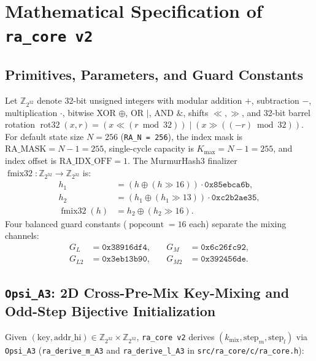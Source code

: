 \documentclass[conference]{IEEEtran}
\DeclareMathOperator{\rot}{rot32}
\DeclareMathOperator{\fmix}{fmix32}
\DeclareMathOperator{\popcount}{popcount}
\begin{document}
\section{Mathematical Specification of \texttt{ra\_core v2}}\label{sec:arch}

\subsection{Primitives, Parameters, and Guard Constants}

Let $\mathbb{Z}_{2^{32}}$ denote 32-bit unsigned integers with modular addition $+$, subtraction $-$, multiplication $\cdot$, bitwise XOR $\oplus$, OR $\mid$, AND $\&$, shifts $\ll, \gg$, and 32-bit barrel rotation $\rot(x, r) = (x \ll (r \bmod 32)) \mid (x \gg ((-r) \bmod 32))$. For default state size $N = 256$ (\texttt{RA\_N = 256}), the index mask is $\text{RA\_MASK} = N - 1 = 255$, single-cycle capacity is $K_{\max} = N - 1 = 255$, and index offset is $\text{RA\_IDX\_OFF} = 1$. The MurmurHash3 finalizer $\fmix: \mathbb{Z}_{2^{32}} \to \mathbb{Z}_{2^{32}}$ is:
\begin{equation}
\begin{aligned}
h_1 &= (h \oplus (h \gg 16)) \cdot \mathtt{0x85ebca6b}, \\
h_2 &= (h_1 \oplus (h_1 \gg 13)) \cdot \mathtt{0xc2b2ae35}, \\
\fmix(h) &= h_2 \oplus (h_2 \gg 16).
\end{aligned}
\end{equation}
Four balanced guard constants ($\popcount = 16$ each) separate the mixing channels:
\begin{equation}
\begin{aligned}
G_L &= \mathtt{0x38916df4}, &\quad G_M &= \mathtt{0x6c26fc92}, \\
G_{L2} &= \mathtt{0x3eb13b90}, &\quad G_{M2} &= \mathtt{0x392456de}.
\end{aligned}
\end{equation}

\subsection{\texttt{Opsi\_A3}: 2D Cross-Pre-Mix Key-Mixing and Odd-Step Bijective Initialization}\label{sec:keymix}

Given $(\text{key}, \text{addr\_hi}) \in \mathbb{Z}_{2^{32}} \times \mathbb{Z}_{2^{32}}$, \texttt{ra\_core v2} derives $(k_{\text{mix}}, \text{step}_m, \text{step}_l)$ via \texttt{Opsi\_A3} (\texttt{ra\_derive\_m\_A3} and \texttt{ra\_derive\_l\_A3} in \texttt{src/ra\_core/c/ra\_core.h}):
\end{document}
